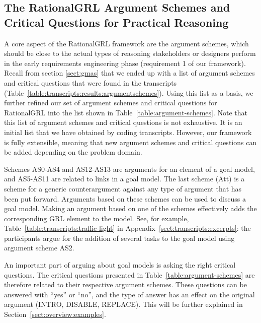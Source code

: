 \subsection{The RationalGRL Argument Schemes and Critical Questions for Practical Reasoning}
\label{sect:overview:as}

A core aspect of the RationalGRL framework are the argument schemes, which should be close to the actual types of reasoning stakeholders or designers perform in the early requirements engineering phase (requirement 1 of our framework). Recall from section \ref{sect:gmas} that we ended up with a list of argument schemes and critical questions that were found in the transcripts (Table~\ref{table:transcripts:results:argumentschemes}). Using this list as a basis, we further refined our set of argument schemes and critical questions for RationalGRL into the list shown in Table~\ref{table:argument-schemes}. Note that this list of argument schemes and critical questions is not exhaustive. It is an initial list that we have obtained by coding transcripts. However, our framework is fully extensible, meaning that new argument schemes and critical questions can be added depending on the problem domain.

Schemes AS0-AS4 and AS12-AS13 are arguments for an element of a goal model, and AS5-AS11 are related to links in a goal model. The last scheme (Att) is a scheme for a generic counterargument against any type of argument that has been put forward. Arguments based on these schemes can be used to discuss a goal model. Making an argument based on one of the schemes effectively adds the corresponding GRL element to the model. See, for example, Table~\ref{table:transcripts:traffic-light} in Appendix~\ref{sect:transcripts:excerpts}: the participants argue for the addition of several tasks to the goal model using argument scheme AS2. 

An important part of arguing about goal models is asking the right critical questions. The critical questions presented in Table~\ref{table:argument-schemes} are therefore related to their respective argument schemes. These questions can be answered with ``yes'' or ``no'', and the type of answer has an effect on the original argument (\textsf{INTRO}, \textsf{DISABLE}, \textsf{REPLACE}). This will be further explained in Section~\ref{sect:overview:examples}. 

